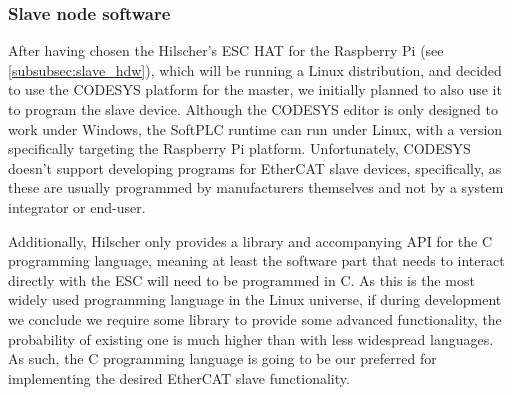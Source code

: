 \subsubsection{Slave node software}

After having chosen the Hilscher's ESC HAT for the Raspberry Pi (see \ref{subsubsec:slave_hdw}), which will be running a Linux distribution, and decided to use the CODESYS platform for the master, we initially planned to also use it to program the slave device.
Although the CODESYS editor is only designed to work under Windows, the SoftPLC runtime can run under Linux, with a version specifically targeting the Raspberry Pi platform.
Unfortunately, CODESYS doesn't support developing programs for EtherCAT slave devices, specifically, as these are usually programmed by manufacturers themselves and not by a system integrator or end-user.

Additionally, Hilscher only provides a library and accompanying API for the C programming language, meaning at least the software part that needs to interact directly with the ESC will need to be programmed in C.
As this is the most widely used programming language in the Linux universe, if during development we conclude we require some library to provide some advanced functionality, the probability of existing one is much higher than with less widespread languages.
As such, the C programming language is going to be our preferred for implementing the desired EtherCAT slave functionality.



